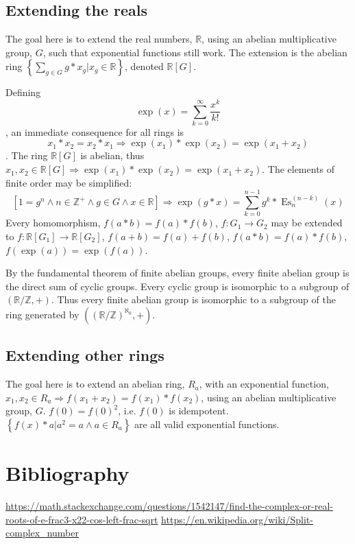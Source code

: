 \documentclass[]{article}
\DeclareMathOperator{\es}{Es}
\newcommand{\pqty}[1]{{\left(#1\right)}}
\newcommand{\Bqty}[1]{{\left\{#1\right\}}}
\newcommand{\bqty}[1]{{\left[#1\right]}}
\begin{document}
	\subsection{Extending the reals}
	The goal here is to extend the real numbers, $\mathbb{R}$, using an abelian multiplicative group, $G$, such that exponential functions still work. The extension is the abelian ring $\Bqty{\sum_{g\in G}g*x_g \bigg\vert x_g\in\mathbb{R}}$, denoted $\mathbb{R}\bqty{G}$.
	
	Defining
	\begin{equation}
	\exp(x)=\sum_{k=0}^{\infty}\frac{x^k}{k!}
	\end{equation}
	, an immediate consequence for all rings is
	\begin{equation}
	x_1*x_2=x_2*x_1\Rightarrow\exp(x_1)*\exp(x_2)=\exp(x_1+x_2)
	\end{equation}
	. The ring $\mathbb{R}\bqty{G}$ is abelian, thus $x_1,x_2\in\mathbb{R}\bqty{G}\Rightarrow\exp(x_1)*\exp(x_2)=\exp(x_1+x_2)$. The elements of finite order may be simplified:
	\begin{equation}
	\bqty{1=g^n\land n\in\mathbb{Z}^+\land g\in G\land x\in\mathbb{R}}\Rightarrow\exp\pqty{g*x}=\sum_{k=0}^{n-1}g^k*\es_n^{(n-k)}\pqty{x}
	\end{equation}
	Every homomorphism, $f\pqty{a*b}=f\pqty{a}*f\pqty{b}$, $f:G_1\rightarrow G_2$ may be extended to $f:\mathbb{R}\bqty{G_1}\rightarrow \mathbb{R}\bqty{G_2}$, $f\pqty{a+b}=f\pqty{a}+f\pqty{b}$, $f\pqty{a*b}=f\pqty{a}*f\pqty{b}$, $f\pqty{\exp\pqty{a}}=\exp\pqty{f\pqty{a}}$.
	
	By the fundamental theorem of finite abelian groups, every finite abelian group is the direct sum of cyclic groups. Every cyclic group is isomorphic to a subgroup of $\pqty{\mathbb{R}/\mathbb{Z},+}$. Thus every finite abelian group is isomorphic to a subgroup of the ring generated by $\pqty{\pqty{\mathbb{R}/\mathbb{Z}}^{\aleph_0},+}$.
	
	\subsection{Extending other rings}
	The goal here is to extend an abelian ring, $R_a$, with an exponential function, $x_1,x_2\in R_a\Rightarrow f(x_1+x_2)=f(x_1)*f(x_2)$, using an abelian multiplicative group, $G$.
	$
	f\pqty{0}=f\pqty{0}^2
	$, i.e. $f\pqty{0}$ is idempotent. $\Bqty{f(x)*a \vert a^2=a\land a\in R_a}$ are all valid exponential functions.
	
	
	
	\section{Bibliography}
	\url{https://math.stackexchange.com/questions/1542147/find-the-complex-or-real-roots-of-e-frac3-x22-cos-left-frac-sqrt}
	\url{https://en.wikipedia.org/wiki/Split-complex_number}
	
\end{document}
